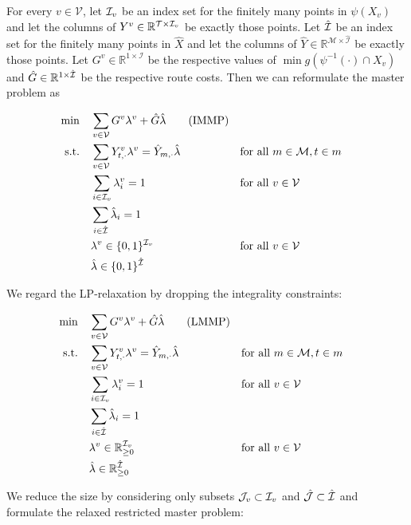For every $v\in\mathcal{V}$, let $\mathcal{I}_v$ be an index set for the finitely many points in $\psi\left(X_v\right)$ and let the columns of $Y^v\in\mathbb{R}^{\mathcal{T}\times\mathcal{I}_v}$ be exactly those points. Let $\hat{\mathcal{I}}$ be an index set for the finitely many points in $\hat{X}$ and let the columns of $\hat{Y}\in\mathbb{R}^{\mathcal{M}\times\hat{\mathcal{I}}}$ be exactly those points. Let $G^v\in\mathbb{R}^{1\times\mathcal{I}}$ be the respective values of $\min g\left(\psi^{-1}(\cdot)\cap X_v\right)$ and $\hat{G}\in\mathbb{R}^{1\times\hat{\mathcal{I}}}$ be the respective route costs. Then we can reformulate the master problem as

\begin{align*}
	\min \quad & \sum_{v\in\mathcal{V}}G^v\lambda^v + \hat{G}\hat{\lambda} \tag{IMMP} \\
	\text{s.t.} \quad & \sum_{v\in\mathcal{V}} Y^v_{t,\cdot}\lambda^v = \hat{Y}_{m,\cdot}\hat{\lambda} && \text{for all } m\in\mathcal{M},t\in m \\
	& \sum_{i\in\mathcal{I}_v}\lambda_i^v=1 && \text{for all } v\in\mathcal{V}\\
	& \sum_{i\in\hat{\mathcal{I}}}\hat{\lambda}_i= 1 \\
	& \lambda^v\in\{0,1\}^{\mathcal{I}_v} && \text{for all } v\in\mathcal{V} \\
	& \hat{\lambda}\in\{0,1\}^{\hat{\mathcal{I}}}
\end{align*}

We regard the LP-relaxation by dropping the integrality constraints:

\begin{align*}
	\min \quad & \sum_{v\in\mathcal{V}}G^v\lambda^v + \hat{G}\hat{\lambda} \tag{LMMP} \label{eq:LMMP} \\
	\text{s.t.} \quad & \sum_{v\in\mathcal{V}} Y^v_{t,\cdot}\lambda^v = \hat{Y}_{m,\cdot}\hat{\lambda} && \text{for all } m\in\mathcal{M},t\in m \\
	& \sum_{i\in\mathcal{I}_v}\lambda_i^v=1 && \text{for all } v\in\mathcal{V}\\
	& \sum_{i\in\hat{\mathcal{I}}}\hat{\lambda}_i= 1 \\
	& \lambda^v\in\mathbb{R}_{\geq 0}^{\mathcal{I}_v} && \text{for all } v\in\mathcal{V} \\
	& \hat{\lambda}\in\mathbb{R}_{\geq 0}^{\hat{\mathcal{I}}}
\end{align*}

We reduce the size by considering only subsets $\mathcal{J}_v\subset\mathcal{I}_v$ and $\hat{\mathcal{J}}\subset\hat{\mathcal{I}}$ and formulate the relaxed restricted master problem:


